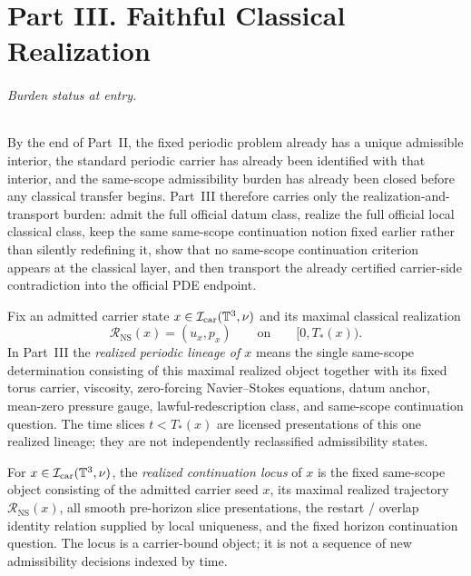 \part*{Part III. Faithful Classical Realization}

\paragraph{Burden status at entry.}
By the end of Part~II, the fixed periodic problem already has a unique admissible interior, the standard periodic carrier has already been identified with that interior, and the same-scope admissibility burden has already been closed before any classical transfer begins. Part~III therefore carries only the realization-and-transport burden: admit the full official datum class, realize the full official local classical class, keep the same same-scope continuation notion fixed earlier rather than silently redefining it, show that no same-scope continuation criterion appears at the classical layer, and then transport the already certified carrier-side contradiction into the official PDE endpoint.

\begin{manualdefinition}
\label{def:realized-lineage-same-object-convention}
Fix an admitted carrier state $x\in\mathcal I_{\mathrm{car}}(\mathbb{T}^3,\nu)$ and its maximal classical realization
\[
\mathcal R_{\mathrm{NS}}(x)=(u_x,p_x)
\qquad\text{on}\qquad [0,T_*(x)).
\]
In Part~III the \emph{realized periodic lineage of $x$} means the single same-scope determination consisting of this maximal realized object together with its fixed torus carrier, viscosity, zero-forcing Navier--Stokes equations, datum anchor, mean-zero pressure gauge, lawful-redescription class, and same-scope continuation question. The time slices $t<T_*(x)$ are licensed presentations of this one realized lineage; they are not independently reclassified admissibility states.
\end{manualdefinition}


\begin{manualdefinition}
\label{def:realized-continuation-locus}
For $x\in\mathcal I_{\mathrm{car}}(\mathbb{T}^3,\nu)$, the \emph{realized continuation locus} of $x$ is the fixed same-scope object consisting of the admitted carrier seed $x$, its maximal realized trajectory $\mathcal R_{\mathrm{NS}}(x)$, all smooth pre-horizon slice presentations, the restart / overlap identity relation supplied by local uniqueness, and the fixed horizon continuation question. The locus is a carrier-bound object; it is not a sequence of new admissibility decisions indexed by time.
\end{manualdefinition}


